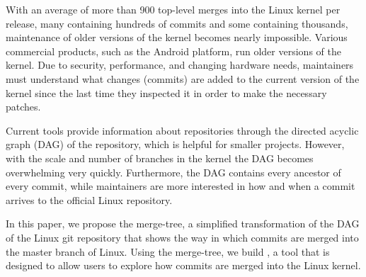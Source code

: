 With an average of more than 900 top-level merges into the Linux kernel
per release, many containing hundreds of commits and some containing
thousands, maintenance of older versions of the kernel becomes nearly
impossible.  Various commercial products, such as the Android platform,
run older versions of the kernel. Due to security, performance, and
changing hardware needs, maintainers must understand what changes
(commits) are added to the current version of the kernel since the last
time they inspected it in order to make the necessary patches.

Current tools provide information about repositories through the
directed acyclic graph (DAG) of the repository, which is helpful for
smaller projects. However, with the scale and number of branches in the
kernel the DAG becomes overwhelming very quickly. Furthermore, the DAG
contains every ancestor of every commit, while maintainers are more
interested in how and when a commit arrives to the official Linux
repository.

In this paper, we propose the merge-tree, a simplified transformation of
the DAG of the Linux git repository that shows the way in which commits
are merged into the master branch of Linux. Using the merge-tree, we
build \tool, a tool that is designed to allow users to explore how
commits are merged into the Linux kernel.



